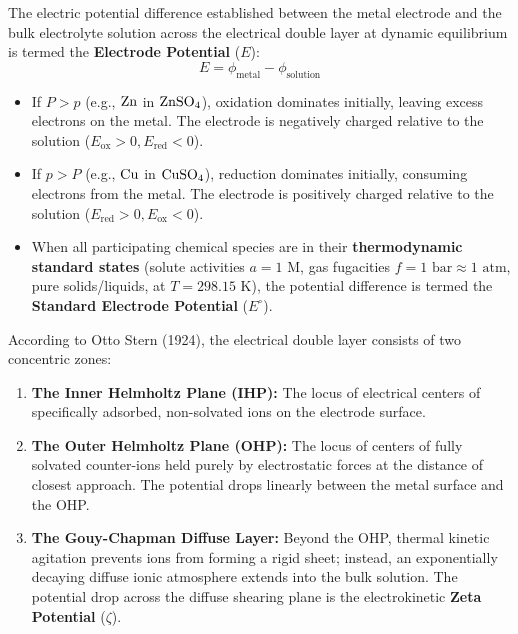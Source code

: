 \begin{conceptbox}
The electric potential difference established between the metal electrode and the bulk electrolyte solution across the electrical double layer at dynamic equilibrium is termed the \textbf{Electrode Potential} ($E$):
\begin{equation}
    E = \phi_{\text{metal}} - \phi_{\text{solution}}
\end{equation}
\begin{itemize}[leftmargin=*]
    \item If $P > p$ (e.g., $\ce{Zn}$ in $\ce{ZnSO4}$), oxidation dominates initially, leaving excess electrons on the metal. The electrode is negatively charged relative to the solution ($E_{\text{ox}} > 0, E_{\text{red}} < 0$).
    \item If $p > P$ (e.g., $\ce{Cu}$ in $\ce{CuSO4}$), reduction dominates initially, consuming electrons from the metal. The electrode is positively charged relative to the solution ($E_{\text{red}} > 0, E_{\text{ox}} < 0$).
    \item When all participating chemical species are in their \textbf{thermodynamic standard states} (solute activities $a = 1\text{ M}$, gas fugacities $f = 1\text{ bar} \approx 1\text{ atm}$, pure solids/liquids, at $T = 298.15\text{ K}$), the potential difference is termed the \textbf{Standard Electrode Potential} ($E^\circ$).
\end{itemize}
\end{conceptbox}

\begin{atkinsbox}
According to Otto Stern (1924), the electrical double layer consists of two concentric zones:
\begin{enumerate}[leftmargin=*]
    \item \textbf{The Inner Helmholtz Plane (IHP):} The locus of electrical centers of specifically adsorbed, non-solvated ions on the electrode surface.
    \item \textbf{The Outer Helmholtz Plane (OHP):} The locus of centers of fully solvated counter-ions held purely by electrostatic forces at the distance of closest approach. The potential drops linearly between the metal surface and the OHP.
    \item \textbf{The Gouy-Chapman Diffuse Layer:} Beyond the OHP, thermal kinetic agitation prevents ions from forming a rigid sheet; instead, an exponentially decaying diffuse ionic atmosphere extends into the bulk solution. The potential drop across the diffuse shearing plane is the electrokinetic \textbf{Zeta Potential} ($\zeta$).
\end{enumerate}
\end{atkinsbox}

